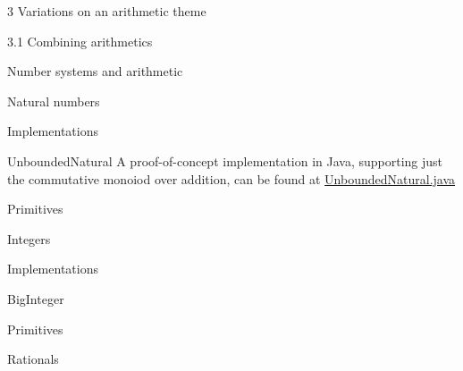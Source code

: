 \documentclass[12pt]{PalisadesLakesBook}
\begin{document}
\begin{plSection}{3 Variations on an arithmetic theme}
\begin{plSection}{3.1 Combining arithmetics}
\begin{plSection}{Number systems and arithmetic}
\begin{plSection}{Natural numbers}
\begin{plSection}{Implementations}
\begin{plSection}{\javaFont UnboundedNatural}
A proof-of-concept implementation in Java,
supporting just the commutative monoiod over addition, 
can be found at
\href{https://github.com/palisades-lakes/sicpplus/blob/main/src/main/java/sicpplus/java/numbers/UnboundedNatural.java}
{\javaFont UnboundedNatural.java}

\end{plSection}%
\begin{plSection}{Primitives}



\end{plSection}%

\end{plSection}%
\end{plSection}%
\begin{plSection}{Integers}


\begin{plSection}{Implementations}
\begin{plSection}{\javaFont BigInteger}



\end{plSection}%
\begin{plSection}{Primitives}



\end{plSection}%
\end{plSection}%
\end{plSection}%
\begin{plSection}{Rationals}



\end{plSection}
\end{plSection}
\end{plSection}
\end{plSection}
\end{document}

